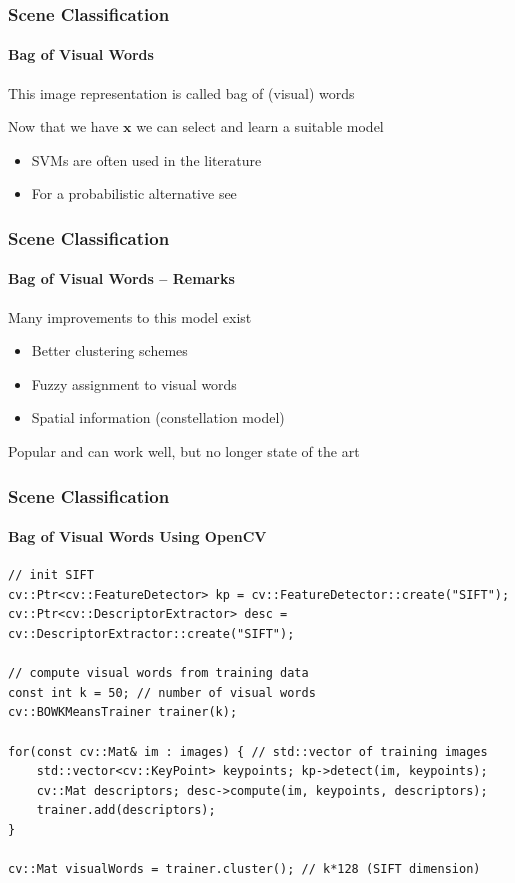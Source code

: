 \documentclass[xetex,professionalfont]{beamer}
\renewcommand{\vec}[1]{\ensuremath{\mathbf{#1}}}
\newcommand{\vx}{\vec{x}}
\renewcommand\emph[1]{\textcolor{tuwcvl_inf_red}{#1}}
\begin{document}

\begin{frame}
\frametitle{Scene Classification}
\framesubtitle{Bag of Visual Words}

This image representation is called \emph{bag of (visual) words}

\bigskip
Now that we have $\vx$ we can select and learn a suitable model
\begin{itemize}
    \item SVMs are often used in the literature
    \item For a probabilistic alternative see \cite{prince12}
\end{itemize}

\end{frame}


\begin{frame}
\frametitle{Scene Classification}
\framesubtitle{Bag of Visual Words -- Remarks}

Many improvements to this model exist
\begin{itemize}
    \item Better clustering schemes
    \item Fuzzy assignment to visual words
    \item Spatial information (constellation model)
\end{itemize}

\bigskip
Popular and can work well, but no longer state of the art %

\end{frame}


\begin{frame}[fragile]
\frametitle{Scene Classification}
\framesubtitle{Bag of Visual Words Using OpenCV}

\footnotesize

\begin{verbatim}
// init SIFT
cv::Ptr<cv::FeatureDetector> kp = cv::FeatureDetector::create("SIFT");
cv::Ptr<cv::DescriptorExtractor> desc = cv::DescriptorExtractor::create("SIFT");

// compute visual words from training data
const int k = 50; // number of visual words
cv::BOWKMeansTrainer trainer(k);

for(const cv::Mat& im : images) { // std::vector of training images
    std::vector<cv::KeyPoint> keypoints; kp->detect(im, keypoints);
    cv::Mat descriptors; desc->compute(im, keypoints, descriptors);
    trainer.add(descriptors);
}

cv::Mat visualWords = trainer.cluster(); // k*128 (SIFT dimension)
\end{verbatim}

\end{frame}
\end{document}
